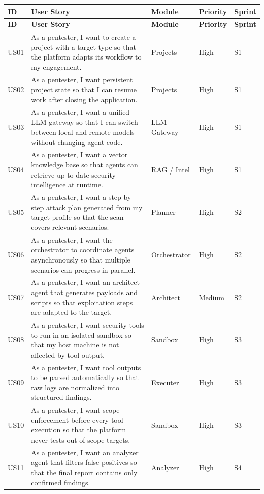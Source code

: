 \documentclass[12pt,a4paper]{report}
\begin{document}
\begin{longtable}{|p{}|p{}|p{}|p{}|p{}|}
\hline
\textbf{ID} & \textbf{User Story} & \textbf{Module} & \textbf{Priority} &
\textbf{Sprint} \\
\hline
\endfirsthead
\hline
\textbf{ID} & \textbf{User Story} & \textbf{Module} & \textbf{Priority} &
\textbf{Sprint} \\
\hline
\endhead
US01 & As a pentester, I want to create a project with a target type so that the
platform adapts its workflow to my engagement. & Projects & High & S1 \\
\hline
US02 & As a pentester, I want persistent project state so that I can resume work
after closing the application. & Projects & High & S1 \\
\hline
US03 & As a pentester, I want a unified LLM gateway so that I can switch between
local and remote models without changing agent code. & LLM Gateway & High & S1 \\
\hline
US04 & As a pentester, I want a vector knowledge base so that agents can retrieve
up-to-date security intelligence at runtime. & RAG / Intel & High & S1 \\
\hline
US05 & As a pentester, I want a step-by-step attack plan generated from my target
profile so that the scan covers relevant scenarios. & Planner & High & S2 \\
\hline
US06 & As a pentester, I want the orchestrator to coordinate agents asynchronously
so that multiple scenarios can progress in parallel. & Orchestrator & High & S2 \\
\hline
US07 & As a pentester, I want an architect agent that generates payloads and scripts
so that exploitation steps are adapted to the target. & Architect & Medium & S2 \\
\hline
US08 & As a pentester, I want security tools to run in an isolated sandbox so that
my host machine is not affected by tool output. & Sandbox & High & S3 \\
\hline
US09 & As a pentester, I want tool outputs to be parsed automatically so that raw
logs are normalized into structured findings. & Executer & High & S3 \\
\hline
US10 & As a pentester, I want scope enforcement before every tool execution so that
the platform never tests out-of-scope targets. & Sandbox & High & S3 \\
\hline
US11 & As a pentester, I want an analyzer agent that filters false positives so that
the final report contains only confirmed findings. & Analyzer & High & S4 \\

\end{longtable}
\end{document}
